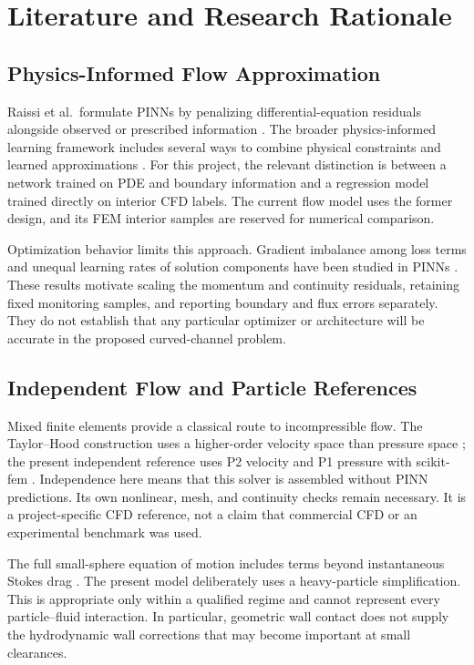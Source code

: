 \chapter{Literature and Research Rationale}
\label{ch:literature}
\section{Physics-Informed Flow Approximation}
Raissi et al.\ formulate PINNs by penalizing differential-equation residuals
alongside observed or prescribed information \cite{raissi2019}. The broader
physics-informed learning framework includes several ways to combine
physical constraints and learned approximations \cite{karniadakis2021}.
For this project, the relevant distinction is between a network trained on
PDE and boundary information and a regression model trained directly on
interior CFD labels. The current flow model uses the former design, and its
FEM interior samples are reserved for numerical comparison.

Optimization behavior limits this approach. Gradient imbalance among loss
terms and unequal learning rates of solution components have been studied
in PINNs \cite{wang2021,wang2022}. These results motivate scaling the
momentum and continuity residuals, retaining fixed monitoring samples, and
reporting boundary and flux errors separately. They do not establish that
any particular optimizer or architecture will be accurate in the proposed
curved-channel problem.

\section{Independent Flow and Particle References}
Mixed finite elements provide a classical route to incompressible flow.
The Taylor--Hood construction uses a higher-order velocity space than
pressure space \cite{taylor1973}; the present independent reference uses
P2 velocity and P1 pressure with scikit-fem \cite{gustafsson2020}.
Independence here means that this solver is assembled without PINN
predictions. Its own nonlinear, mesh, and continuity checks remain necessary.
It is a project-specific CFD reference, not a claim that commercial CFD or
an experimental benchmark was used.

The full small-sphere equation of motion includes terms beyond instantaneous
Stokes drag \cite{maxey1983}. The present model deliberately uses a
heavy-particle simplification. This is appropriate only within a qualified
regime and cannot represent every particle--fluid interaction. In particular,
geometric wall contact does not supply the hydrodynamic wall corrections
that may become important at small clearances.

